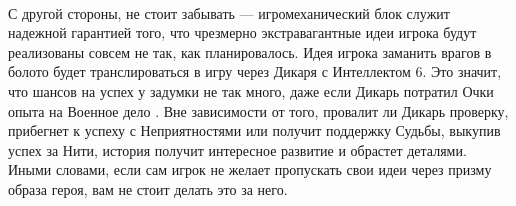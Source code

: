 \paragraph{}
С другой стороны, не стоит забывать — игромеханический блок служит надежной гарантией того, что чрезмерно экстравагантные идеи игрока будут реализованы совсем не так, как планировалось. Идея игрока заманить врагов в болото будет транслироваться в игру через Дикаря с Интеллектом 6. Это значит, что шансов на успех у задумки не так много, даже если Дикарь потратил Очки опыта на Военное дело . Вне зависимости от того, провалит ли Дикарь проверку, прибегнет к успеху с Неприятностями или получит поддержку Судьбы, выкупив успех за Нити, история получит интересное развитие и обрастет деталями. Иными словами, если сам игрок не желает пропускать свои идеи через призму образа героя, вам не стоит делать это за него.
